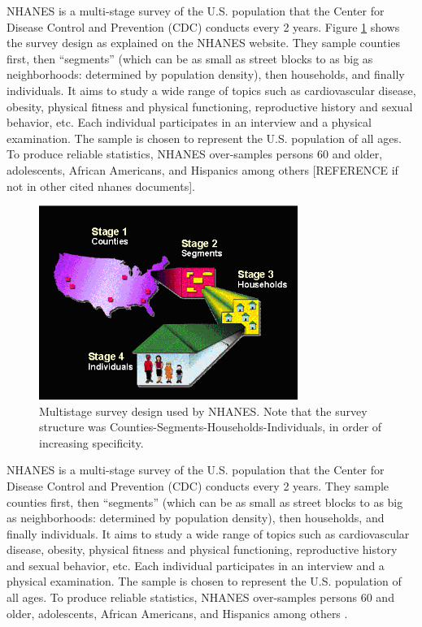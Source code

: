\documentclass{article}
\begin{document}
NHANES is a multi-stage survey of the U.S. population that the Center for Disease Control and Prevention (CDC) conducts every 2 years. Figure \ref{fig:survey.design} shows the survey design as explained on the NHANES website.  They sample counties first, then ``segments'' (which can be as small as street blocks to as big as neighborhoods: determined by population density), then households, and finally individuals.  It aims to study a wide range of topics such as cardiovascular disease, obesity, physical fitness and physical functioning, reproductive history and sexual behavior, etc.  Each individual participates in an interview and a physical examination.  The sample is chosen to represent the U.S. population of all ages.  To produce reliable statistics, NHANES over-samples persons 60 and older, adolescents, African Americans, and Hispanics among others [REFERENCE if not in other cited nhanes documents].  

\begin{figure}
\centering
\includegraphics[width=0.75\textwidth]{figures/Survey_Design.PNG}
\caption{Multistage survey design used by NHANES. Note that the survey structure was Counties-Segments-Households-Individuals, in order of increasing specificity.}
\label{fig:survey.design}
\end{figure}

NHANES is a multi-stage survey of the U.S. population that the Center for Disease Control and Prevention (CDC) conducts every 2 years.  They sample counties first, then ``segments'' (which can be as small as street blocks to as big as neighborhoods: determined by population density), then households, and finally individuals.  It aims to study a wide range of topics such as cardiovascular disease, obesity, physical fitness and physical functioning, reproductive history and sexual behavior, etc.  Each individual participates in an interview and a physical examination.  The sample is chosen to represent the U.S. population of all ages.  To produce reliable statistics, NHANES over-samples persons 60 and older, adolescents, African Americans, and Hispanics among others \cite{survey}. 
\end{document}
